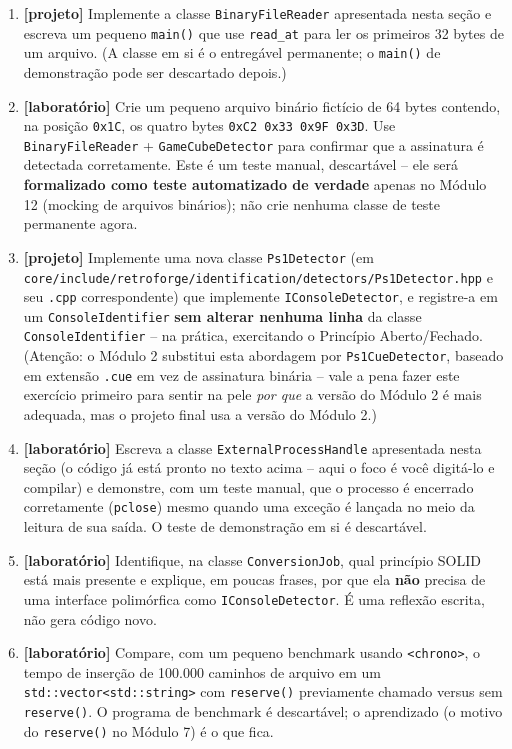 \begin{CaixaDesafio}
\begin{enumerate}[label=\textbf{0.\arabic*}]
    \item \textbf{[projeto]} Implemente a classe \texttt{BinaryFileReader} apresentada nesta seção e escreva um pequeno \texttt{main()} que use \texttt{read\_at} para ler os primeiros 32 bytes de um arquivo. (A classe em si é o entregável permanente; o \texttt{main()} de demonstração pode ser descartado depois.)
    \item \textbf{[laboratório]} Crie um pequeno arquivo binário fictício de 64 bytes contendo, na posição \texttt{0x1C}, os quatro bytes \texttt{0xC2 0x33 0x9F 0x3D}. Use \texttt{BinaryFileReader} + \texttt{GameCubeDetector} para confirmar que a assinatura é detectada corretamente. Este é um teste manual, descartável -- ele será \textbf{formalizado como teste automatizado de verdade} apenas no Módulo 12 (mocking de arquivos binários); não crie nenhuma classe de teste permanente agora.
    \item \textbf{[projeto]} Implemente uma nova classe \texttt{Ps1Detector} (em \texttt{core/include/retroforge/identification/detectors/Ps1Detector.hpp} e seu \texttt{.cpp} correspondente) que implemente \texttt{IConsoleDetector}, e registre-a em um \texttt{ConsoleIdentifier} \textbf{sem alterar nenhuma linha} da classe \texttt{ConsoleIdentifier} -- na prática, exercitando o Princípio Aberto/Fechado. (Atenção: o Módulo 2 substitui esta abordagem por \texttt{Ps1CueDetector}, baseado em extensão \texttt{.cue} em vez de assinatura binária -- vale a pena fazer este exercício primeiro para sentir na pele \textit{por que} a versão do Módulo 2 é mais adequada, mas o projeto final usa a versão do Módulo 2.)
    \item \textbf{[laboratório]} Escreva a classe \texttt{ExternalProcessHandle} apresentada nesta seção (o código já está pronto no texto acima -- aqui o foco é você digitá-lo e compilar) e demonstre, com um teste manual, que o processo é encerrado corretamente (\texttt{pclose}) mesmo quando uma exceção é lançada no meio da leitura de sua saída. O teste de demonstração em si é descartável.
    \item \textbf{[laboratório]} Identifique, na classe \texttt{ConversionJob}, qual princípio SOLID está mais presente e explique, em poucas frases, por que ela \textbf{não} precisa de uma interface polimórfica como \texttt{IConsoleDetector}. É uma reflexão escrita, não gera código novo.
    \item \textbf{[laboratório]} Compare, com um pequeno benchmark usando \texttt{<chrono>}, o tempo de inserção de 100.000 caminhos de arquivo em um \texttt{std::vector<std::string>} com \texttt{reserve()} previamente chamado versus sem \texttt{reserve()}. O programa de benchmark é descartável; o aprendizado (o motivo do \texttt{reserve()} no Módulo 7) é o que fica.
\end{enumerate}
\end{CaixaDesafio}

